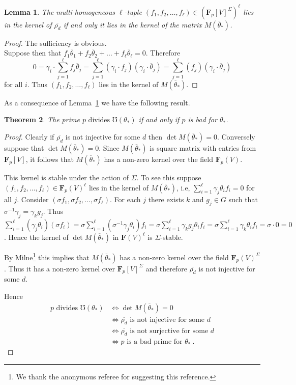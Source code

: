 \documentclass[12pt]{amsart}
\newcommand{\FF}{\mathbf{F}} %
\newcommand{\FF}{\mathbb{F}} %
\newtheorem{thm}{Theorem}[section]
\newtheorem{lem}[thm]{Lemma}
\theoremstyle{definition}
\newcommand{\btheta}{{\overline{\theta}}}
\newcommand{\bth}{{{\theta_*}}} %
\begin{document}
\begin{lem}\label{lem: tuple}
  The multi-homogeneous $\ell$-tuple $(f_1,f_2,\dots,f_\ell)\in (\FF_p[V]^{\Sigma})^\ell$ lies in the kernel of $\overline{\rho_d}$ if and only it lies in the kernel of the matrix $M(\overline{\theta}_*)$.  
 \end{lem}

\begin{proof}
  The sufficiency is obvious.\\ 
  Suppose then that $f_1\btheta_1 + f_2\btheta_2+ \dots +f_\ell\btheta_\ell=0$.
  Therefore 
$$0= \gamma_i \cdot \sum_{j=1}^\ell f_j \btheta_j 
    = \sum_{j=1}^\ell (\gamma_i\cdot f_j) (\gamma_i\cdot \btheta_j)
    = \sum_{j=1}^\ell (f_j) (\gamma_i\cdot \btheta_j)$$
    for all $i$.  Thus $(f_1,f_2,\dots,f_\ell)$ lies in the kernel of $M(\overline{\theta}_*)$.
\end{proof}

As a consequence of Lemma~\ref{lem: tuple} we have the following result.
\begin{thm}
The prime $p\text{ divides }\mho(\bth)$ if and only if $p$ is bad for $\bth$. 
\end{thm}
\begin{proof}
Clearly if $\overline{\rho_d}$ is not injective for some 
$d$ then $\det M(\overline{\theta}_*) = 0$.  Conversely suppose that
$\det M(\overline{\theta}_*) = 0$.  Since $M(\overline{\theta}_*)$ is square
matrix with entries from $\FF_p[V]$, it follows that 
$M(\overline{\theta}_*)$ has a non-zero kernel over the field
$\FF_p(V)$.  

This kernel is stable under the action of $\Sigma$.  To see this suppose 
$(f_1,f_2,\dots,f_\ell) \in \FF_p(V)^\ell$ lies in the kernel of
$M(\overline{\theta}_*)$,
i.e, $\sum_{i=1}^\ell \gamma_j \theta_i f_i = 0$ for all $j$.  Consider
$(\sigma f_1,\sigma f_2,\dots,\sigma f_\ell)$.  For each $j$ there exists $k$
and $g_j \in G$ such that 
$\sigma^{-1}\gamma_j = \gamma_k g_j$.
Thus 
$\sum_{i=1}^\ell (\gamma_j \theta_i) (\sigma f_i)= 
\sigma \sum_{i=1}^\ell (\sigma^{-1} \gamma_j\theta_i) f_i
=\sigma \sum_{i=1}^\ell \gamma_k g_j \theta_i f_i
=\sigma \sum_{i=1}^\ell \gamma_k \theta_i f_i
= \sigma \cdot 0 = 0$.
Hence the kernel of $\det M(\overline{\theta}_*)$ in $\FF(V)^\ell$ is $\Sigma$-stable.

By Milne\footnote{We thank the anonymous referee for suggesting this reference.} \cite[Lemma 3.4]{M} this implies that $M(\overline{\theta}_*)$ has a non-zero kernel over the field
$\FF_p(V)^{\Sigma}$.  
Thus it has a non-zero kernel over $\FF_p[V]^\Sigma$
and therefore $\overline{\rho_d}$ is not injective for some 
$d$.

Hence
  \begin{align*}
    p\text{ divides }\mho(\bth) &\iff \det M(\overline{\theta}_*) = 0\\
    & \iff \overline{\rho_d}\text{ is not injective for some }d \\
    &\iff \overline{\rho_d}\text{ is not surjective for some }d\\
    &\iff p\text{ is a bad prime for }\bth \ .
  \end{align*}
\end{proof}
\end{document}
